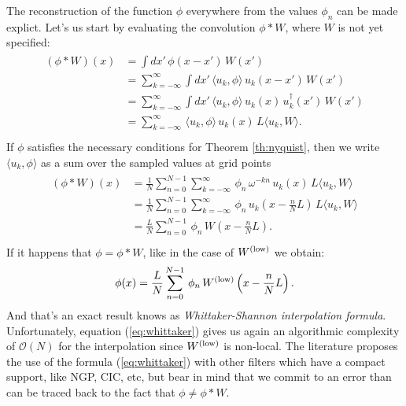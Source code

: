 The reconstruction of the function $\phi$ everywhere
from the values $\phi_n$ can be made explict.
Let's us start by evaluating the convolution $\phi * W$,
where $W$ is not yet specified:
\begin{align}
    \begin{split}
        \left( \phi* W \right)(x) 
            &= \int dx'\, \phi(x-x')\, W(x') \\
            &= \sum_{k=-\infty}^{\infty}\int dx'\,\langle u_k,\phi\rangle\,u_k(x-x')\, W(x')\\
            &= \sum_{k=-\infty}^{\infty}\int dx'\,\langle u_k,\phi\rangle\,
                u_k(x)\,u_k^{\dagger}(x')\, W(x') \\
            &= \sum_{k=-\infty}^{\infty} \,\langle u_k,\phi\rangle\,
                u_k(x)\, L\langle u_k, W\rangle. \\
    \end{split}
\end{align}
If $\phi$ satisfies the necessary conditions
for Theorem \ref{th:nyquist}, then 
we write $\langle u_k,\phi\rangle$ as a sum over the sampled values
at grid points
\begin{align}
    \begin{split}
        \left( \phi* W \right)(x) 
            &=\frac{1}{N} \sum_{n=0}^{N-1} \sum_{k=-\infty}^{\infty} \,
                \phi_n\, \omega^{-kn} \,
                u_k(x)\, L\langle u_k, W\rangle \\
            &=\frac{1}{N} \sum_{n=0}^{N-1} \sum_{k=-\infty}^{\infty} \,
                \phi_n\,
                u_k\left(x-\frac{n}{N}L\right)\, L\langle u_k, W\rangle \\
            &=\frac{L}{N} \sum_{n=0}^{N-1} \,
                \phi_n\,
                 W\left(x-\frac{n}{N}L\right). \\
    \end{split}
\end{align}
If it happens that $\phi = \phi* W$, like in the case of $W^\mathrm{(low)}$ we
obtain:
\begin{equation}
    \phi(x) = 
            \frac{L}{N} \sum_{n=0}^{N-1} \,
                \phi_n\,
                 W^\mathrm{(low)}\left(x-\frac{n}{N}L\right).
   \label{eq:whittaker}
\end{equation}
And that's an exact result knows as \emph{Whittaker-Shannon interpolation formula}.
Unfortunately, equation (\ref{eq:whittaker}) gives us again 
an algorithmic complexity of $\mathcal{O}(N)$ for the interpolation
since $W^\mathrm{(low)}$ is non-local.
The literature \cite{hockney} proposes the use of the formula (\ref{eq:whittaker})
with other filters which have a compact support, like NGP, CIC, etc,
but bear in mind that we commit to an error than can be traced
back to the fact that $\phi \ne \phi * W$.

